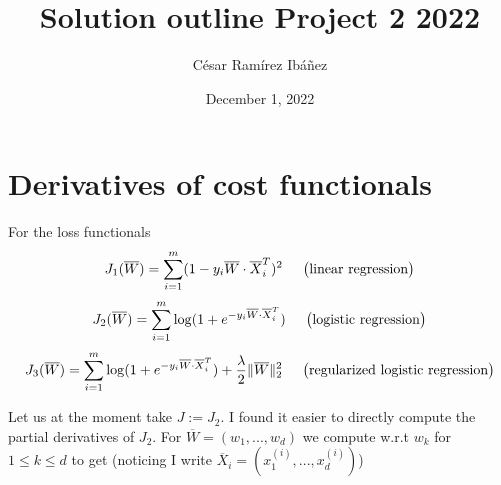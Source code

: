 \documentclass[12pt,a4paper]{article}
\title{Solution outline Project 2 2022}
\author{C\'{e}sar Ram\'{i}rez Ib\'{a}\~{n}ez  }
\date{December 1, 2022 }
\begin{document}
\maketitle

\section{Derivatives of cost functionals}
 

For the loss functionals
\begin{equation}\label{1} 
J_1(\overline{W})=\sum_{i=1}^m (1-y_i \overline{W}\cdot\overline{X}_i^T)^2 \hspace{0.2in}
\big( \text{linear regression}\big)
\end{equation}
\begin{equation}\label{2} 
J_2(\overline{W})=\sum_{i=1}^m \log(1+ e^{-y_i \overline{W}\cdot\overline{X}_i^T}) \hspace{0.2in}\big( \text{logistic regression}\big)
\end{equation}
\begin{equation}\label{3} 
J_3(\overline{W})=\sum_{i=1}^m \log(1+ e^{-y_i \overline{W}\cdot\overline{X}_i^T}) +\frac{\lambda}{2}\|\overline{W}\|_2^2 \hspace{0.2in}\big( \text{regularized logistic regression}\big)
\end{equation}


Let us at the moment take $J:=J_2$. I found it easier to directly compute the partial derivatives of $J_2$. For $\overline{W}=(w_1,...,w_d)$ we compute w.r.t $w_k$ for $1\leq  k\leq d$ to get (noticing I write  $\overline{X}_i=(x_1^{(i)},..., x_d^{(i)})$)
\end{document}

